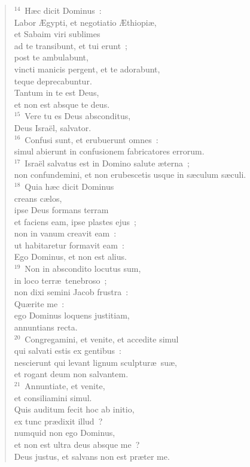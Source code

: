 \begin{verse}${}^{14}$~H\ae c dicit Dominus~:\\ Labor \AE gypti, et negotiatio \AE thiopi\ae ,\\ et Sabaim viri sublimes\\ ad te transibunt, et tui erunt~;\\ post te ambulabunt,\\ vincti manicis pergent, et te adorabunt,\\ teque deprecabuntur.\\ Tantum in te est Deus,\\ et non est absque te deus.\\
${}^{15}$~Vere tu es Deus absconditus,\\ Deus Isra\"el, salvator.\\
${}^{16}$~Confusi sunt, et erubuerunt omnes~:\\ simul abierunt in confusionem fabricatores errorum.\\
${}^{17}$~Isra\"el salvatus est in Domino salute \ae terna~;\\ non confundemini, et non erubescetis usque in s\ae culum s\ae culi.\\
${}^{18}$~Quia h\ae c dicit Dominus\\ creans c\ae los,\\ ipse Deus formans terram\\ et faciens eam, ipse plastes ejus~;\\ non in vanum creavit eam~:\\ ut habitaretur formavit eam~:\\ Ego Dominus, et non est alius.\\
${}^{19}$~Non in abscondito locutus sum,\\ in loco terr\ae\ tenebroso~;\\ non dixi semini Jacob frustra~:\\ Qu\ae rite me~:\\ ego Dominus loquens justitiam,\\ annuntians recta.\\
${}^{20}$~Congregamini, et venite, et accedite simul\\ qui salvati estis ex gentibus~:\\ nescierunt qui levant lignum sculptur\ae\ su\ae ,\\ et rogant deum non salvantem.\\
${}^{21}$~Annuntiate, et venite,\\ et consiliamini simul.\\ Quis auditum fecit hoc ab initio,\\ ex tunc pr\ae dixit illud~?\\ numquid non ego Dominus,\\ et non est ultra deus absque me~?\\ Deus justus, et salvans non est pr\ae ter me.\\

\end{verse}
